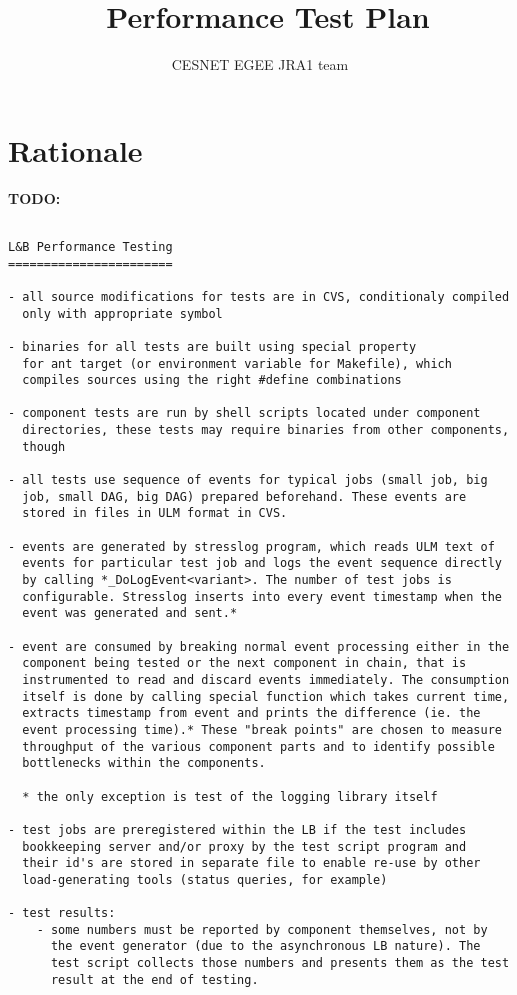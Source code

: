 \documentclass{egee}
\title{\LB\ Performance Test Plan}
\author{CESNET EGEE JRA1 team}
\def\todo#1{\textbf{TODO:} #1}
\begin{document}

\newpage
\tableofcontents
\newpage

\section{Rationale}
\todo{}

\begin{verbatim}

L&B Performance Testing
=======================

- all source modifications for tests are in CVS, conditionaly compiled
  only with appropriate symbol

- binaries for all tests are built using special property 
  for ant target (or environment variable for Makefile), which
  compiles sources using the right #define combinations

- component tests are run by shell scripts located under component
  directories, these tests may require binaries from other components,
  though

- all tests use sequence of events for typical jobs (small job, big
  job, small DAG, big DAG) prepared beforehand. These events are
  stored in files in ULM format in CVS.

- events are generated by stresslog program, which reads ULM text of
  events for particular test job and logs the event sequence directly
  by calling *_DoLogEvent<variant>. The number of test jobs is
  configurable. Stresslog inserts into every event timestamp when the
  event was generated and sent.*

- event are consumed by breaking normal event processing either in the
  component being tested or the next component in chain, that is
  instrumented to read and discard events immediately. The consumption
  itself is done by calling special function which takes current time,
  extracts timestamp from event and prints the difference (ie. the
  event processing time).* These "break points" are chosen to measure
  throughput of the various component parts and to identify possible
  bottlenecks within the components.

  * the only exception is test of the logging library itself

- test jobs are preregistered within the LB if the test includes
  bookkeeping server and/or proxy by the test script program and
  their id's are stored in separate file to enable re-use by other
  load-generating tools (status queries, for example)

- test results:
    - some numbers must be reported by component themselves, not by
      the event generator (due to the asynchronous LB nature). The
      test script collects those numbers and presents them as the test
      result at the end of testing.


\end{verbatim}
\end{document}
